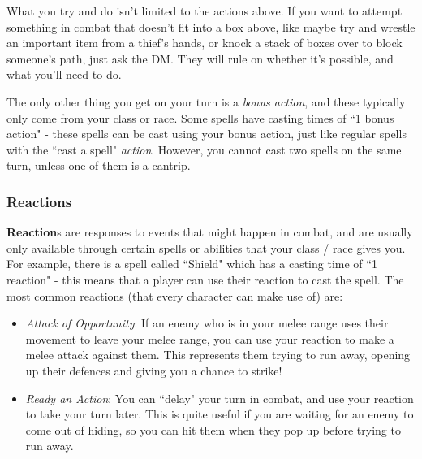 \documentclass[10pt,a4paper]{article}
\begin{document}
What you try and do isn't limited to the actions above.
If you want to attempt something in combat that doesn't fit into a box above, like maybe try and wrestle an important item from a thief's hands, or knock a stack of boxes over to block someone's path, just ask the DM.
They will rule on whether it's possible, and what you'll need to do.

The only other thing you get on your turn is a \emph{bonus action}, and these typically only come from your class or race.
Some spells have casting times of ``1 bonus action" - these spells can be cast using your bonus action, just like regular spells with the ``cast a spell" \emph{action}.
However, you cannot cast two spells on the same turn, unless one of them is a cantrip.

\subsubsection{Reactions}

\textbf{Reaction}s are responses to events that might happen in combat, and are usually only available through certain spells or abilities that your class / race gives you.
For example, there is a spell called ``Shield" which has a casting time of ``1 reaction" - this means that a player can use their reaction to cast the spell.
The most common reactions (that every character can make use of) are:
\begin{itemize}
    \item \emph{Attack of Opportunity}: If an enemy who is in your melee range uses their movement to leave your melee range, you can use your reaction to make a melee attack against them. This represents them trying to run away, opening up their defences and giving you a chance to strike!
    \item \emph{Ready an Action}: You can ``delay" your turn in combat, and use your reaction to take your turn later. This is quite useful if you are waiting for an enemy to come out of hiding, so you can hit them when they pop up before trying to run away.
\end{itemize}
\end{document}
